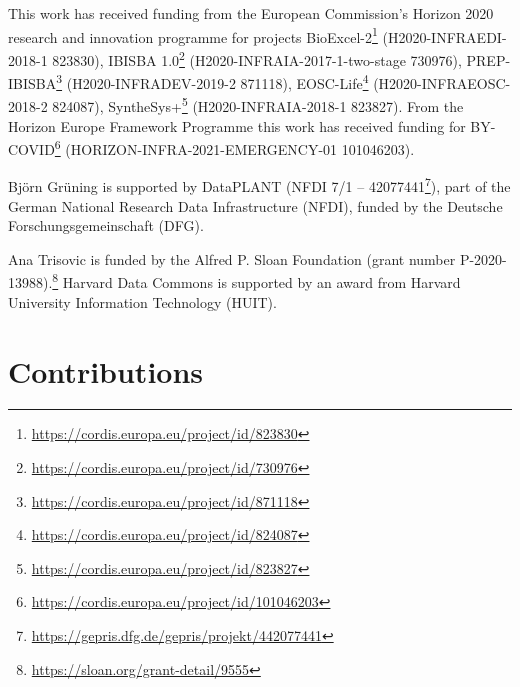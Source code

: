 \documentclass[ds,v1.1.2,openaccess]{iosart2x}%
\begin{document}
\begin{acks}
This work has received funding from the European Commission's Horizon
2020 research and innovation programme for projects
BioExcel-2\footnote{\url{https://cordis.europa.eu/project/id/823830}}
(H2020-INFRAEDI-2018-1 823830), IBISBA
1.0\footnote{\url{https://cordis.europa.eu/project/id/730976}}
(H2020-INFRAIA-2017-1-two-stage 730976),
PREP-IBISBA\footnote{\url{https://cordis.europa.eu/project/id/871118}}
(H2020-INFRADEV-2019-2 871118),
EOSC-Life\footnote{\url{https://cordis.europa.eu/project/id/824087}}
(H2020-INFRAEOSC-2018-2 824087),
SyntheSys+\footnote{\url{https://cordis.europa.eu/project/id/823827}}
(H2020-INFRAIA-2018-1 823827). From the Horizon Europe Framework
Programme this work has received funding for
BY-COVID\footnote{\url{https://cordis.europa.eu/project/id/101046203}}
(HORIZON-INFRA-2021-EMERGENCY-01 101046203).

Bj\"{o}rn Gr\"{u}ning is supported by DataPLANT (NFDI 7/1 --
42077441\footnote{\url{https://gepris.dfg.de/gepris/projekt/442077441}}), part of the
German National Research Data Infrastructure (NFDI), funded by the
Deutsche Forschungsgemeinschaft (DFG).

Ana Trisovic is funded by the Alfred P. Sloan Foundation (grant number
P-2020-13988).\footnote{\url{https://sloan.org/grant-detail/9555}} Harvard Data
Commons is supported by an award from Harvard University Information
Technology (HUIT).
\end{acks}

 \section*{Contributions}
\end{document}
